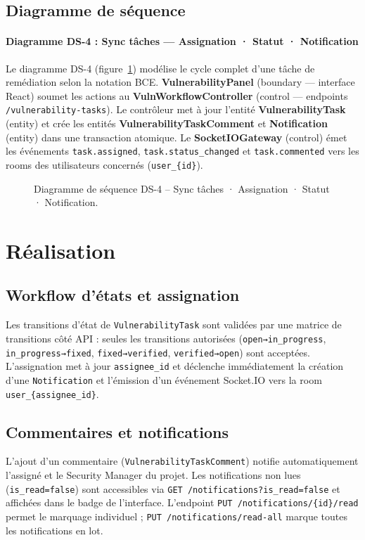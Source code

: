 \subsection{Diagramme de séquence}

\paragraph{Diagramme DS-4 : Sync tâches — Assignation · Statut · Notification}

Le diagramme DS-4 (figure~\ref{fig:sprint4-seq}) modélise le cycle complet d'une tâche de remédiation selon la notation BCE. \textbf{VulnerabilityPanel} (boundary — interface React) soumet les actions au \textbf{VulnWorkflowController} (control — endpoints \texttt{/vulnerability-tasks}). Le contrôleur met à jour l'entité \textbf{VulnerabilityTask} (entity) et crée les entités \textbf{VulnerabilityTaskComment} et \textbf{Notification} (entity) dans une transaction atomique. Le \textbf{SocketIOGateway} (control) émet les événements \texttt{task.assigned}, \texttt{task.status\_changed} et \texttt{task.commented} vers les rooms des utilisateurs concernés (\texttt{user\_\{id\}}).

\begin{figure}[H]
\centering
\fbox{\rule{0pt}{2in}\rule{0.9\linewidth}{0pt}}
\caption{Diagramme de séquence DS-4 -- Sync tâches · Assignation · Statut · Notification.}
\label{fig:sprint4-seq}
\end{figure}

\section{Réalisation}

\subsection{Workflow d'états et assignation}
Les transitions d'état de \texttt{VulnerabilityTask} sont validées par une matrice de transitions côté API : seules les transitions autorisées (\texttt{open→in\_progress}, \texttt{in\_progress→fixed}, \texttt{fixed→verified}, \texttt{verified→open}) sont acceptées. L'assignation met à jour \texttt{assignee\_id} et déclenche immédiatement la création d'une \texttt{Notification} et l'émission d'un événement Socket.IO vers la room \texttt{user\_\{assignee\_id\}}.

\subsection{Commentaires et notifications}
L'ajout d'un commentaire (\texttt{VulnerabilityTaskComment}) notifie automatiquement l'assigné et le Security Manager du projet. Les notifications non lues (\texttt{is\_read=false}) sont accessibles via \texttt{GET /notifications?is\_read=false} et affichées dans le badge de l'interface. L'endpoint \texttt{PUT /notifications/\{id\}/read} permet le marquage individuel ; \texttt{PUT /notifications/read-all} marque toutes les notifications en lot.

